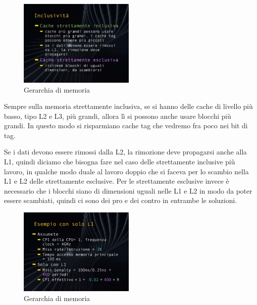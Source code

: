 \FloatBarrier
\begin{figure}[H]
  \centering
  \includegraphics[width=0.50\textwidth,
                    trim=20 20 10 20, %
                    clip]
                    {images/Lez06_p05_fig_03}
  \caption{Gerarchia di memoria}
  \label{fig:Lez06_p05_fig_03}
\end{figure}
\FloatBarrier
\noindent

Sempre sulla memoria strettamente inclusiva, se si hanno delle cache di livello più basso, tipo L2 e L3, più grandi, allora lì si possono anche usare blocchi più grandi. In questo modo si risparmiano cache tag che vedremo fra poco nei bit di tag.

Se i dati devono essere rimossi dalla L2, la rimozione deve propagarsi anche alla L1, quindi diciamo che bisogna fare nel  caso delle strettamente inclusive più lavoro, in qualche modo duale al lavoro doppio che si faceva per lo scambio nella L1 e L2 delle strettamente esclusive.
Per le strettamente esclusive invece è necessario che i blocchi siano di dimensioni uguali nelle L1 e L2 in modo da poter essere scambiati, quindi ci sono dei pro e dei contro in entrambe le soluzioni.

\FloatBarrier
\begin{figure}[H]
  \centering
  \includegraphics[width=0.50\textwidth,
                    trim=20 20 10 20, %
                    clip]
                    {images/Lez06_p05_fig_04}
  \caption{Gerarchia di memoria}
  \label{fig:Lez06_p05_fig_04}
\end{figure}
\FloatBarrier
\noindent

